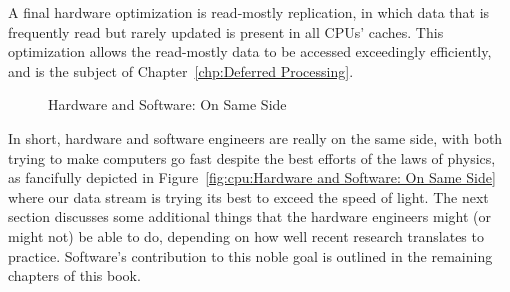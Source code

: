 A final hardware optimization is read-mostly replication, in which
data that is frequently read but rarely updated is present in all
CPUs' caches.
This optimization allows the read-mostly data to be accessed
exceedingly efficiently, and is the subject of
Chapter~\ref{chp:Deferred Processing}.

\begin{figure}[tb]
\centering
{}
\caption{Hardware and Software: On Same Side}
\end{figure}

In short, hardware and software engineers are really on the same side,
with both trying to make computers go fast despite the best efforts of
the laws of physics, as fancifully depicted in
Figure~\ref{fig:cpu:Hardware and Software: On Same Side}
where our data stream is trying its best to exceed the speed of light.
The next section discusses some additional things that the hardware engineers
might (or might not) be able to do, depending on how well recent
research translates to practice.
Software's contribution to this noble goal is outlined in the remaining
chapters of this book.
